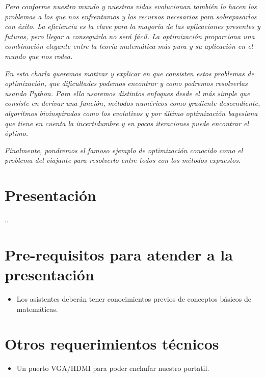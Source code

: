 \documentclass[runningheads]{llncs}
\begin{document}
	\textit{Pero conforme nuestro mundo y nuestras vidas evolucionan también lo hacen los problemas a los que nos enfrentamos y los recursos necesarios para sobrepasarlos con éxito. La eficiencia es la clave para la mayoría de las aplicaciones presentes y futuras, pero llegar a conseguirla no será fácil. La optimización proporciona una combinación elegante entre la teoría matemática más pura y su aplicación en el mundo que nos rodea.}
	
	\textit{En esta charla queremos motivar y explicar en que consisten estos problemas de optimización, que dificultades podemos encontrar y como podremos resolverlas usando Python. Para ello usaremos distintos enfoques desde el más simple que consiste en derivar una función, métodos numéricos como gradiente descendiente, algoritmos bioinspirados como los evolutivos y por último optimización bayesiana que tiene en cuenta la incertidumbre y en pocas iteraciones puede encontrar el óptimo.}
	
	\textit{Finalmente, pondremos el famoso ejemplo de optimización conocido como el problema del viajante para resolverlo entre todos con los métodos expuestos.}

\section{Presentaci\'on}
..


\section{Pre-requisitos para atender a la presentación}
\begin{itemize}
\item  Los asistentes deber\'an tener conocimientos previos de conceptos básicos de matemáticas. 
\end{itemize}

\section{Otros requerimientos t\'ecnicos}
\begin{itemize}
 \item Un puerto VGA/HDMI para poder enchufar nuestro portatil.
\end{itemize}

\clearpage



\end{document}
